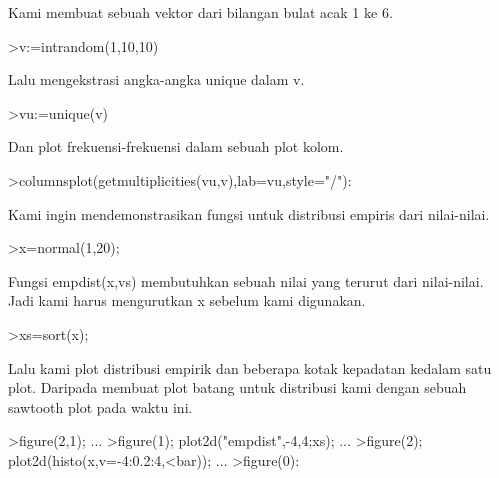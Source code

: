 \documentclass[a4paper,10pt]{article}
\begin{document}
\begin{eulernotebook}
\begin{eulercomment}
Kami membuat sebuah vektor dari bilangan bulat acak 1 ke 6.
\end{eulercomment}
\begin{eulerprompt}
>v:=intrandom(1,10,10)
\end{eulerprompt}
\begin{euleroutput}
  [8,  5,  8,  8,  6,  8,  8,  3,  5,  5]
\end{euleroutput}
\begin{eulercomment}
Lalu mengekstrasi angka-angka unique dalam v.
\end{eulercomment}
\begin{eulerprompt}
>vu:=unique(v)
\end{eulerprompt}
\begin{euleroutput}
  [3,  5,  6,  8]
\end{euleroutput}
\begin{eulercomment}
Dan plot frekuensi-frekuensi dalam sebuah plot kolom.
\end{eulercomment}
\begin{eulerprompt}
>columnsplot(getmultiplicities(vu,v),lab=vu,style="/"):
\end{eulerprompt}
\begin{eulercomment}
Kami ingin mendemonstrasikan fungsi untuk distribusi empiris dari nilai-nilai.
\end{eulercomment}
\begin{eulerprompt}
>x=normal(1,20);
\end{eulerprompt}
\begin{eulercomment}
Fungsi empdist(x,vs) membutuhkan sebuah nilai yang terurut dari nilai-nilai. Jadi kami
harus mengurutkan x sebelum kami digunakan.
\end{eulercomment}
\begin{eulerprompt}
>xs=sort(x);
\end{eulerprompt}
\begin{eulercomment}
Lalu kami plot distribusi empirik dan beberapa kotak kepadatan kedalam satu plot. Daripada
membuat plot batang untuk distribusi kami dengan sebuah sawtooth plot pada waktu ini.
\end{eulercomment}
\begin{eulerprompt}
>figure(2,1); ...
>figure(1); plot2d("empdist",-4,4;xs); ...
>figure(2); plot2d(histo(x,v=-4:0.2:4,<bar));  ...
>figure(0):
\end{eulerprompt}

\end{eulernotebook}
\end{document}
